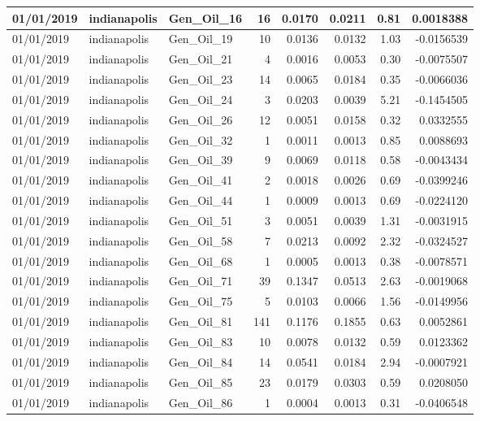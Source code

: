\documentclass[
  letterpaper,
  DIV=11,
  numbers=noendperiod]{scrartcl}
\begin{document}
\begin{tabular}{l|l|l|r|r|r|r|r}
\hline
01/01/2019 & indianapolis & Gen\_Oil\_16 & 16 & 0.0170 & 0.0211 & 0.81 & 0.0018388\\
\hline
01/01/2019 & indianapolis & Gen\_Oil\_19 & 10 & 0.0136 & 0.0132 & 1.03 & -0.0156539\\
\hline
01/01/2019 & indianapolis & Gen\_Oil\_21 & 4 & 0.0016 & 0.0053 & 0.30 & -0.0075507\\
\hline
01/01/2019 & indianapolis & Gen\_Oil\_23 & 14 & 0.0065 & 0.0184 & 0.35 & -0.0066036\\
\hline
01/01/2019 & indianapolis & Gen\_Oil\_24 & 3 & 0.0203 & 0.0039 & 5.21 & -0.1454505\\
\hline
01/01/2019 & indianapolis & Gen\_Oil\_26 & 12 & 0.0051 & 0.0158 & 0.32 & 0.0332555\\
\hline
01/01/2019 & indianapolis & Gen\_Oil\_32 & 1 & 0.0011 & 0.0013 & 0.85 & 0.0088693\\
\hline
01/01/2019 & indianapolis & Gen\_Oil\_39 & 9 & 0.0069 & 0.0118 & 0.58 & -0.0043434\\
\hline
01/01/2019 & indianapolis & Gen\_Oil\_41 & 2 & 0.0018 & 0.0026 & 0.69 & -0.0399246\\
\hline
01/01/2019 & indianapolis & Gen\_Oil\_44 & 1 & 0.0009 & 0.0013 & 0.69 & -0.0224120\\
\hline
01/01/2019 & indianapolis & Gen\_Oil\_51 & 3 & 0.0051 & 0.0039 & 1.31 & -0.0031915\\
\hline
01/01/2019 & indianapolis & Gen\_Oil\_58 & 7 & 0.0213 & 0.0092 & 2.32 & -0.0324527\\
\hline
01/01/2019 & indianapolis & Gen\_Oil\_68 & 1 & 0.0005 & 0.0013 & 0.38 & -0.0078571\\
\hline
01/01/2019 & indianapolis & Gen\_Oil\_71 & 39 & 0.1347 & 0.0513 & 2.63 & -0.0019068\\
\hline
01/01/2019 & indianapolis & Gen\_Oil\_75 & 5 & 0.0103 & 0.0066 & 1.56 & -0.0149956\\
\hline
01/01/2019 & indianapolis & Gen\_Oil\_81 & 141 & 0.1176 & 0.1855 & 0.63 & 0.0052861\\
\hline
01/01/2019 & indianapolis & Gen\_Oil\_83 & 10 & 0.0078 & 0.0132 & 0.59 & 0.0123362\\
\hline
01/01/2019 & indianapolis & Gen\_Oil\_84 & 14 & 0.0541 & 0.0184 & 2.94 & -0.0007921\\
\hline
01/01/2019 & indianapolis & Gen\_Oil\_85 & 23 & 0.0179 & 0.0303 & 0.59 & 0.0208050\\
\hline
01/01/2019 & indianapolis & Gen\_Oil\_86 & 1 & 0.0004 & 0.0013 & 0.31 & -0.0406548\\

\end{tabular}
\end{document}
